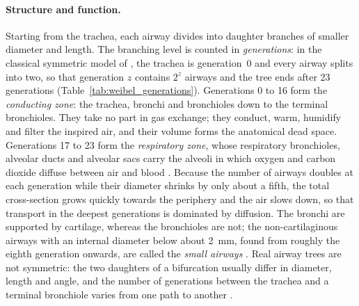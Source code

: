 \paragraph{Structure and function.}      %
Starting from the trachea, each airway divides into daughter branches of smaller diameter and
length. The branching level is counted in \emph{generations}: in the classical symmetric model
of \citet{weibel1963}, the trachea is generation~0 and every airway splits into two, so that
generation $z$ contains $2^z$ airways and the tree ends after 23 generations
(Table~\ref{tab:weibel_generations}). Generations 0 to 16 form the \emph{conducting zone}:
the trachea, bronchi and bronchioles down to the terminal bronchioles. They take no part in gas
exchange; they conduct, warm, humidify and filter the inspired air, and their volume forms the
anatomical dead space. Generations 17 to 23 form the \emph{respiratory zone}, whose
respiratory bronchioles, alveolar ducts and alveolar sacs carry the alveoli in which oxygen and
carbon dioxide diffuse between air and blood \cite{weibel1963}. Because the number of airways
doubles at each generation while their diameter shrinks by only about a fifth, the total
cross-section grows quickly towards the periphery and the air slows down, so that transport in
the deepest generations is dominated by diffusion. The bronchi are supported by cartilage,
whereas the bronchioles are not; the non-cartilaginous airways with an internal diameter below
about 2~mm, found from roughly the eighth generation onwards, are called the \emph{small
airways} \cite{burgel2013small}. Real airway trees are not symmetric: the two daughters of a
bifurcation usually differ in diameter, length and angle, and the number of generations
between the trachea and a terminal bronchiole varies from one path to another
\cite{horsfield1971models,kitaoka1999}.

